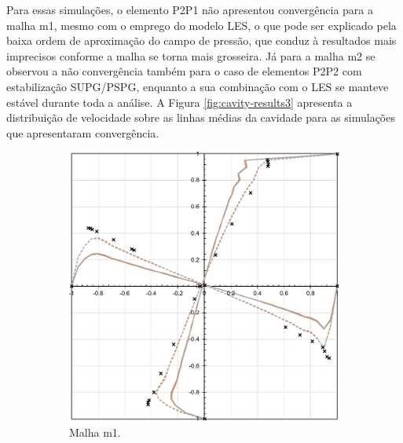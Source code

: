 Para essas simulações, o elemento P2P1 não apresentou convergência para a malha m1, mesmo com o emprego do modelo LES, o que pode ser explicado pela baixa ordem de aproximação do campo de pressão, que conduz à resultados mais imprecisos conforme a malha se torna mais grosseira. Já para a malha m2 se observou a não convergência também para o caso de elementos P2P2 com estabilização SUPG/PSPG, enquanto a sua combinação com o LES se manteve estável durante toda a análise. A Figura \ref{fig:cavity-results3} apresenta a distribuição de velocidade sobre as linhas médias da cavidade para as simulações que apresentaram convergência.

\begin{figure}[h!]
    \centering
    \caption{Cavidade bidimensional - Valores do campo de velocidade sobre as linhas médias para as malhas m1 e m2.}
    \begin{subfigure}{0.49\textwidth}
        \includegraphics[width=\linewidth]{Figuras/Cavity/res-m1.pdf}
        \caption{Malha m1.}
    \end{subfigure}
    \begin{subfigure}{0.49\textwidth}

\end{subfigure}
\end{figure}
